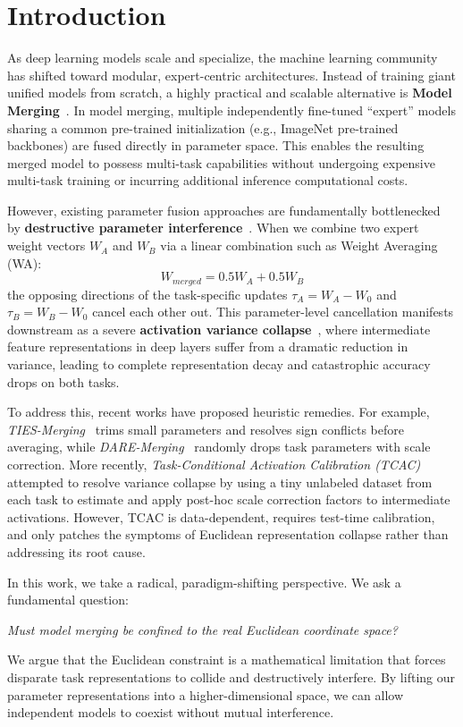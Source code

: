 \documentclass{article}
\theoremstyle{plain}
\theoremstyle{definition}
\theoremstyle{remark}
\begin{document}
\section{Introduction}
\label{sec:intro}
As deep learning models scale and specialize, the machine learning community has shifted toward modular, expert-centric architectures. Instead of training giant unified models from scratch, a highly practical and scalable alternative is \textbf{Model Merging}~\cite{ilharco2022editing,yadav2023resolving}. In model merging, multiple independently fine-tuned ``expert'' models sharing a common pre-trained initialization (e.g., ImageNet pre-trained backbones) are fused directly in parameter space. This enables the resulting merged model to possess multi-task capabilities without undergoing expensive multi-task training or incurring additional inference computational costs.

However, existing parameter fusion approaches are fundamentally bottlenecked by \textbf{destructive parameter interference}~\cite{yadav2023resolving,yu2024language}. When we combine two expert weight vectors $W_A$ and $W_B$ via a linear combination such as Weight Averaging (WA):
\begin{equation}
W_{merged} = 0.5 W_A + 0.5 W_B
\end{equation}
the opposing directions of the task-specific updates $\tau_A = W_A - W_0$ and $\tau_B = W_B - W_0$ cancel each other out. This parameter-level cancellation manifests downstream as a severe \textbf{activation variance collapse}~\cite{tcac2025}, where intermediate feature representations in deep layers suffer from a dramatic reduction in variance, leading to complete representation decay and catastrophic accuracy drops on both tasks.

To address this, recent works have proposed heuristic remedies. For example, \emph{TIES-Merging}~\cite{yadav2023resolving} trims small parameters and resolves sign conflicts before averaging, while \emph{DARE-Merging}~\cite{yu2024language} randomly drops task parameters with scale correction. More recently, \emph{Task-Conditional Activation Calibration (TCAC)}~\cite{tcac2025} attempted to resolve variance collapse by using a tiny unlabeled dataset from each task to estimate and apply post-hoc scale correction factors to intermediate activations. However, TCAC is data-dependent, requires test-time calibration, and only patches the symptoms of Euclidean representation collapse rather than addressing its root cause.

In this work, we take a radical, paradigm-shifting perspective. We ask a fundamental question:
\begin{center}
\emph{Must model merging be confined to the real Euclidean coordinate space?}
\end{center}
We argue that the Euclidean constraint is a mathematical limitation that forces disparate task representations to collide and destructively interfere. By lifting our parameter representations into a higher-dimensional space, we can allow independent models to coexist without mutual interference.
\end{document}
